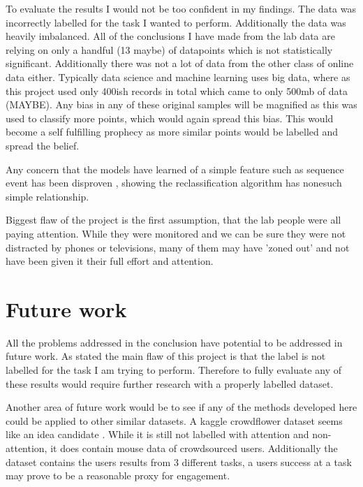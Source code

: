 \documentclass{article}
\begin{document}
To evaluate the results I would not be too confident in my findings.
The data was incorrectly labelled for the task I wanted to perform.
Additionally the data was heavily imbalanced.
All of the conclusions I have made from the lab data are relying on only a handful (13 maybe) of datapoints which is not statistically significant.
Additionally there was not a lot of data from the other class of online data either.
Typically data science and machine learning uses big data, where as this project used only 400ish records in total which came to only 500mb of data (MAYBE).
Any bias in any of these original samples will be magnified as this was used to classify more points, which would again spread this bias.
This would become a self fulfilling prophecy as more similar points would be labelled and spread the belief.

Any concern that the models have learned of a simple feature such as sequence event has been disproven
, showing the reclassification algorithm has nonesuch simple relationship.

Biggest flaw of the project is the first assumption, that the lab people were all paying attention.
While they were monitored and we can be sure they were not distracted by phones or televisions, many of them may have 'zoned out' and not have been given it their full effort and attention.


\section{Future work}

All the problems addressed in the conclusion have potential to be addressed in future work.
As stated the main flaw of this project is that the label is not labelled for the task I am trying to perform.
Therefore to fully evaluate any of these results would require further research with a properly labelled dataset.

Another area of future work would be to see if any of the methods developed here could be applied to other similar datasets.
A kaggle crowdflower dataset seems like an idea candidate \cite{kaggleWorkerActivity}.
While it is still not labelled with attention and non-attention, it does contain mouse data of crowdsourced users.
Additionally the dataset contains the users results from 3 different tasks, a users success at a task may prove to be a reasonable proxy for engagement. 

\printbibliography
\end{document}

